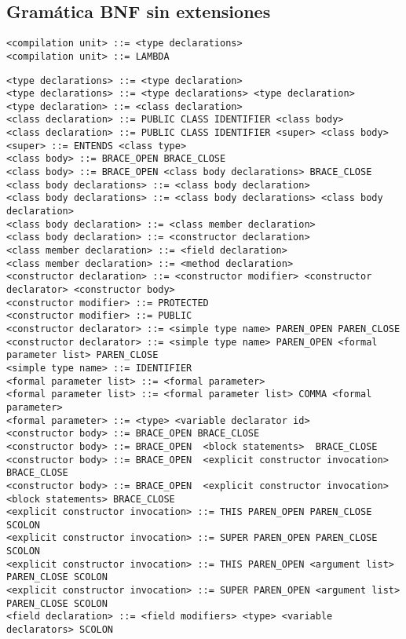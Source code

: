 \documentclass [a4paper,abstracton,titlepage]{scrartcl}
\begin{document}
\subsection{Gramática BNF sin extensiones}
\label{_gramática_bnf_sin_extensiones}
\begin{lstlisting}<compilation unit> ::= <type declarations>
<compilation unit> ::= LAMBDA\end{lstlisting}

\begin{lstlisting}<type declarations> ::= <type declaration>
<type declarations> ::= <type declarations> <type declaration>
<type declaration> ::= <class declaration>
<class declaration> ::= PUBLIC CLASS IDENTIFIER <class body>
<class declaration> ::= PUBLIC CLASS IDENTIFIER <super> <class body>
<super> ::= ENTENDS <class type>
<class body> ::= BRACE_OPEN BRACE_CLOSE
<class body> ::= BRACE_OPEN <class body declarations> BRACE_CLOSE
<class body declarations> ::= <class body declaration>
<class body declarations> ::= <class body declarations> <class body declaration>
<class body declaration> ::= <class member declaration>
<class body declaration> ::= <constructor declaration>
<class member declaration> ::= <field declaration>
<class member declaration> ::= <method declaration>
<constructor declaration> ::= <constructor modifier> <constructor declarator> <constructor body>
<constructor modifier> ::= PROTECTED
<constructor modifier> ::= PUBLIC
<constructor declarator> ::= <simple type name> PAREN_OPEN PAREN_CLOSE
<constructor declarator> ::= <simple type name> PAREN_OPEN <formal parameter list> PAREN_CLOSE
<simple type name> ::= IDENTIFIER
<formal parameter list> ::= <formal parameter>
<formal parameter list> ::= <formal parameter list> COMMA <formal parameter>
<formal parameter> ::= <type> <variable declarator id>
<constructor body> ::= BRACE_OPEN BRACE_CLOSE
<constructor body> ::= BRACE_OPEN  <block statements>  BRACE_CLOSE
<constructor body> ::= BRACE_OPEN  <explicit constructor invocation> BRACE_CLOSE
<constructor body> ::= BRACE_OPEN  <explicit constructor invocation> <block statements> BRACE_CLOSE
<explicit constructor invocation> ::= THIS PAREN_OPEN PAREN_CLOSE SCOLON
<explicit constructor invocation> ::= SUPER PAREN_OPEN PAREN_CLOSE SCOLON
<explicit constructor invocation> ::= THIS PAREN_OPEN <argument list> PAREN_CLOSE SCOLON
<explicit constructor invocation> ::= SUPER PAREN_OPEN <argument list> PAREN_CLOSE SCOLON
<field declaration> ::= <field modifiers> <type> <variable declarators> SCOLON

\end{lstlisting}
\end{document}
